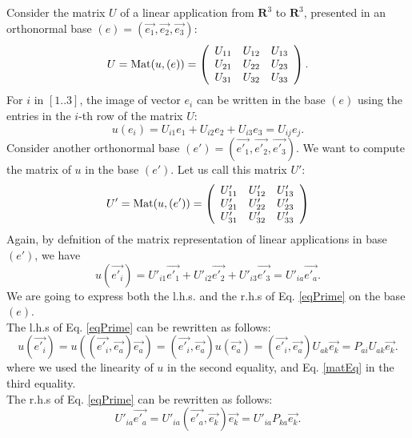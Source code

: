 \documentclass[DIV=12]{article}
\begin{document}
 Consider the matrix $U$ of a linear application from $\mathbf{R}^3$ to $\mathbf{R}^3$,
 presented in an orthonormal base $(e) = (\vec{e_1},\vec{e_2},\vec{e_3})$:
\begin{equation}
U = \mathrm{Mat}( u, (e) ) =  \left(
   \begin{array}{l l l}
      U_{11}  & U_{12} & U_{13} \\
      U_{21}   & U_{22} & U_{23}\\
      U_{31} & U_{32} & U_{33}
   \end{array}
   \right).
\end{equation}
 For $i$ in $[1..3]$, the image of vector $e_i$ can be written in the base $(e)$ using
 the entries in the $i$-th row of the matrix $U$:
\begin{equation}
 u( e_i) = U_{i1}e_1 + U_{i2}e_2 + U_{i3}e_3 = U_{ij}e_j.
\label{matEq}
\end{equation}
 Consider another orthonormal base $(e') = (\vec{e'_1},\vec{e'_2},\vec{e'_3})$.
We want to compute the matrix of $u$ in the base $(e')$. Let us call this 
 matrix $U'$:
\begin{equation}
U' = \mathrm{Mat}( u, (e') ) =  \left(
   \begin{array}{l l l}
      U'_{11}  & U'_{12} & U'_{13} \\
      U'_{21}   & U'_{22} & U'_{23}\\
      U'_{31} & U'_{32} & U'_{33}
   \end{array}
   \right)
\end{equation}
Again, by defnition of the matrix representation of linear applications
in base $(e')$, we have
\begin{equation}
 u( \vec{e'_i}) = U'_{i1}\vec{e'_1}+ U'_{i2}\vec{e'_2} + U'_{i3}\vec{e'_3} = U'_{ia}\vec{e'_a}.
\label{eqPrime}
\end{equation}
We are going to express both the l.h.s. and the r.h.s of Eq. \ref{eqPrime} on the base $(e)$.\\
The l.h.s of Eq.  \ref{eqPrime} can be rewritten as follows:
\begin{equation}
 u( \vec{e'_i}) = u( (\vec{e'_i}, \vec{e_a}) \vec{e_a} ) =  (\vec{e'_i}, \vec{e_a}) u( \vec{e_a}) = (\vec{e'_i}, \vec{e_a}) U_{ak} \vec{e_k} = P_{ai}U_{ak}\vec{e_k}.
\label{lhs}
\end{equation}
where we used the linearity of $u$ in the second equality, 
 and Eq. \ref{matEq} in the third equality.\\
The r.h.s of Eq.  \ref{eqPrime} can be rewritten as follows:
 \begin{equation}
 U'_{ia}\vec{e'_a} = U'_{ia}(\vec{e'_a}, \vec{e_k}) \vec{e_k} = U'_{ia}P_{ka}\vec{e_k}. 
\label{rhs}
\end{equation}
\end{document}

